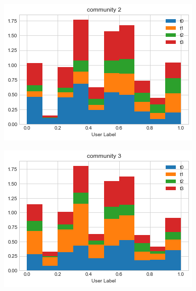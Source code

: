 \documentclass[sigchi]{acmart}
\begin{document}
\begin{figure}[h]
\begin{minipage}[b]{.48\linewidth}
\centering\includegraphics[width=0.9\linewidth]{report/img/community_distribution_2.png}\label{fig:famdis}
\end{minipage}
\begin{minipage}[b]{.48\linewidth}
\centering\large \includegraphics[width=0.9\linewidth]{report/img/community_distribution_3.png}
\end{minipage}%


\end{figure}
\end{document}
